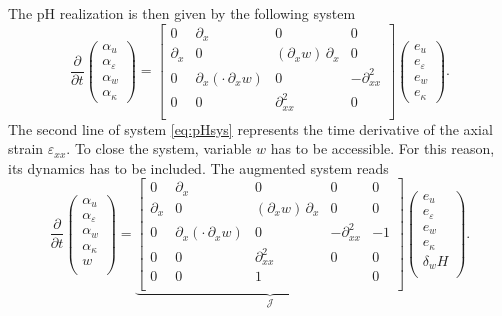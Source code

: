 \documentclass{ifacconf}
\begin{document}
The pH realization is then given by the following system
\begin{equation}\label{eq:pHsys}
	\frac{\partial}{\partial t}
	\begin{pmatrix}
		\alpha_u \\
		\alpha_\varepsilon \\
		\alpha_w \\
		\alpha_\kappa
	\end{pmatrix} = 
	\begin{bmatrix}
		0 & \partial_x & 0 & 0 \\
		\partial_x & 0 & (\partial_x w) \, \partial_x & 0 \\
		0 & \partial_x(\cdot \, \partial_x w) & 0 & -\partial_{xx}^2 \\
		0 & 0 & \partial_{xx}^2 & 0 \\ 
	\end{bmatrix}
	\begin{pmatrix}
		e_u \\
		e_\varepsilon \\
		e_w \\
		e_\kappa 
	\end{pmatrix}.
\end{equation}
The second line of system \eqref{eq:pHsys} represents the time derivative of the axial strain $\varepsilon_{xx}$. To close the system, variable $w$ has to be accessible. For this reason, its dynamics has to be included. The augmented system reads
\begin{equation}\label{eq:pHsys_aug}
	\frac{\partial}{\partial t}
	\begin{pmatrix}
		\alpha_u \\
		\alpha_\varepsilon \\
		\alpha_w \\
		\alpha_\kappa \\
		w \\
	\end{pmatrix} = 
	\underbrace{\begin{bmatrix}
			0 & \partial_x & 0 & 0 & 0\\
			\partial_x & 0 & (\partial_x w) \, \partial_x & 0 & 0 \\
			0 & \partial_x(\cdot \, \partial_x w) & 0 & -\partial_{xx}^2 & -1 \\
			0 & 0 & \partial_{xx}^2 & 0 & 0 \\ 
			0 & 0 & 1 &  & 0 \\
	\end{bmatrix}}_{\mathcal{J}}
	\begin{pmatrix}
		e_u \\
		e_\varepsilon \\
		e_w \\
		e_\kappa \\
		\delta_w H  \\
	\end{pmatrix}.
\end{equation}
\end{document}
